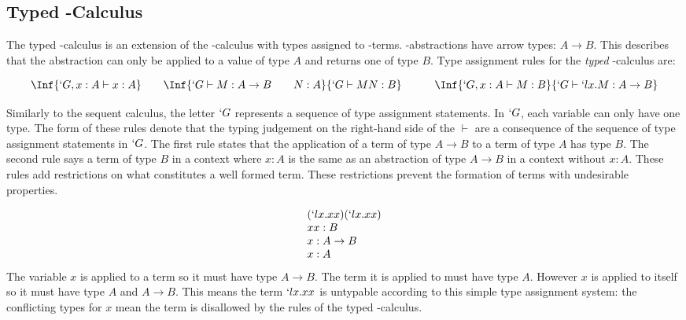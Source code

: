  \subsection{Typed \lam-Calculus}
  The typed \lam-calculus is an extension of the \lam-calculus with types assigned to \lam-terms.
  \lam-abstractions have arrow types: $A \to B$.
  This describes that the abstraction can only be applied to a value of type $A$ and returns one of type $B$.
  Type assignment rules for the \emph{typed} \lam-calculus are:

  \[
  \begin{array}{c@{\quad\quad}c@{\quad\quad\quad}c}
    \Inf{ `G,x:A \vdash x : A }
    &
    \Inf{
      `G \vdash M : A \to B \hspace{20pt} N:A 
    }{
      `G \vdash M N : B 
    }
    &
    \Inf{
      `G,x:A \vdash M : B
    }{
      `G \vdash `lx.M : A \to B 
    }
    \vspace{5pt}
    \end{array}
  \]
  Similarly to the sequent calculus, 
  the letter $`G$ represents a sequence of type assignment statements.
  In $`G$, each variable can only have one type.
  The form of these rules denote that the typing judgement on the right-hand side of the $\vdash$ are a consequence of the sequence of type assignment statements in $`G$.
  The first rule states that the application of a term of type $A \to B$ to
  a term of type $A$ has type $B$. 
  The second rule says a term of type $B$ in a context where $x:A$ is the same as an abstraction of type $A \to B$ in a context without $x:A$. 
  These rules add restrictions on what constitutes a well formed term.
  These restrictions prevent the formation of terms with undesirable properties.  
  
  \begin{example}
  \[  
  \begin{array}{lr}
    (`lx.xx)(`lx.xx) \\
    xx : B \\
    x : A \to B \\
    x : A
  \end{array}
  \]
  The variable $x$ is applied to a term so it must have type $A \to B$.
  The term it is applied to must have type $A$.
  However $x$ is applied to itself so it must have type $A$ and $A \to B$.
  This means the term $`lx.xx$ is untypable according to this simple type assignment system:
  the conflicting types for $x$ mean the term is disallowed by the rules of the typed \lam-calculus.
  \end{example}
 
